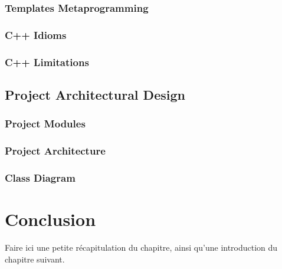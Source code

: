 \begin{spacing}{1.2}
\subsubsection{Templates Metaprogramming}
\subsubsection{C++ Idioms}
\subsubsection{C++ Limitations}
\subsection{Project Architectural Design}
\subsubsection{Project Modules}
\subsubsection{Project Architecture}
\subsubsection{Class Diagram}

 
\section*{Conclusion}
Faire ici une petite récapitulation du chapitre, ainsi qu'une introduction du chapitre suivant.





\end{spacing}

